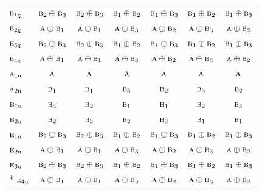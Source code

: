 \documentclass[10pt,a4paper]{article}
\numberwithin{equation}{section}
\newcommand{\irr}[1]{\text{\normalfont\scshape #1}}
\newcommand{\ptag}[1]{\mathrm{#1}}
\begin{document}
{\begin{longtable}{@{}lcccccc@{}}
$\irr{e}_{1\ptag{g}}$ & $\irr{b}_{2}\oplus \irr{b}_{3}$ & $\irr{b}_{2}\oplus \irr{b}_{3}$ & $\irr{b}_{1}\oplus \irr{b}_{2}$ & $\irr{b}_{1}\oplus \irr{b}_{3}$ & $\irr{b}_{1}\oplus \irr{b}_{2}$ & $\irr{b}_{1}\oplus \irr{b}_{3}$\\
$\irr{e}_{2\ptag{g}}$ & $\irr{a}\oplus \irr{b}_{1}$ & $\irr{a}\oplus \irr{b}_{1}$ & $\irr{a}\oplus \irr{b}_{3}$ & $\irr{a}\oplus \irr{b}_{2}$ & $\irr{a}\oplus \irr{b}_{3}$ & $\irr{a}\oplus \irr{b}_{2}$\\
$\irr{e}_{3\ptag{g}}$ & $\irr{b}_{2}\oplus \irr{b}_{3}$ & $\irr{b}_{2}\oplus \irr{b}_{3}$ & $\irr{b}_{1}\oplus \irr{b}_{2}$ & $\irr{b}_{1}\oplus \irr{b}_{3}$ & $\irr{b}_{1}\oplus \irr{b}_{2}$ & $\irr{b}_{1}\oplus \irr{b}_{3}$\\
$\irr{e}_{4\ptag{g}}$ & $\irr{a}\oplus \irr{b}_{1}$ & $\irr{a}\oplus \irr{b}_{1}$ & $\irr{a}\oplus \irr{b}_{3}$ & $\irr{a}\oplus \irr{b}_{2}$ & $\irr{a}\oplus \irr{b}_{3}$ & $\irr{a}\oplus \irr{b}_{2}$\\
$\irr{a}_{1\ptag{u}}$ & $\irr{a}$ & $\irr{a}$ & $\irr{a}$ & $\irr{a}$ & $\irr{a}$ & $\irr{a}$\\
$\irr{a}_{2\ptag{u}}$ & $\irr{b}_{1}$ & $\irr{b}_{1}$ & $\irr{b}_{3}$ & $\irr{b}_{2}$ & $\irr{b}_{3}$ & $\irr{b}_{2}$\\
$\irr{b}_{1\ptag{u}}$ & $\irr{b}_{3}$ & $\irr{b}_{2}$ & $\irr{b}_{1}$ & $\irr{b}_{1}$ & $\irr{b}_{2}$ & $\irr{b}_{3}$\\
$\irr{b}_{2\ptag{u}}$ & $\irr{b}_{2}$ & $\irr{b}_{3}$ & $\irr{b}_{2}$ & $\irr{b}_{3}$ & $\irr{b}_{1}$ & $\irr{b}_{1}$\\
$\irr{e}_{1\ptag{u}}$ & $\irr{b}_{2}\oplus \irr{b}_{3}$ & $\irr{b}_{2}\oplus \irr{b}_{3}$ & $\irr{b}_{1}\oplus \irr{b}_{2}$ & $\irr{b}_{1}\oplus \irr{b}_{3}$ & $\irr{b}_{1}\oplus \irr{b}_{2}$ & $\irr{b}_{1}\oplus \irr{b}_{3}$\\
$\irr{e}_{2\ptag{u}}$ & $\irr{a}\oplus \irr{b}_{1}$ & $\irr{a}\oplus \irr{b}_{1}$ & $\irr{a}\oplus \irr{b}_{3}$ & $\irr{a}\oplus \irr{b}_{2}$ & $\irr{a}\oplus \irr{b}_{3}$ & $\irr{a}\oplus \irr{b}_{2}$\\
$\irr{e}_{3\ptag{u}}$ & $\irr{b}_{2}\oplus \irr{b}_{3}$ & $\irr{b}_{2}\oplus \irr{b}_{3}$ & $\irr{b}_{1}\oplus \irr{b}_{2}$ & $\irr{b}_{1}\oplus \irr{b}_{3}$ & $\irr{b}_{1}\oplus \irr{b}_{2}$ & $\irr{b}_{1}\oplus \irr{b}_{3}$\\*
$\irr{e}_{4\ptag{u}}$ & $\irr{a}\oplus \irr{b}_{1}$ & $\irr{a}\oplus \irr{b}_{1}$ & $\irr{a}\oplus \irr{b}_{3}$ & $\irr{a}\oplus \irr{b}_{2}$ & $\irr{a}\oplus \irr{b}_{3}$ & $\irr{a}\oplus \irr{b}_{2}$\\
\bottomrule\end{longtable}}
\end{document}
